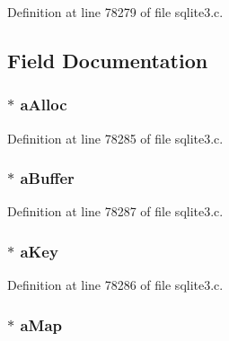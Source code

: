 Definition at line 78279 of file sqlite3.\+c.



\subsection{Field Documentation}
\hypertarget{struct_pma_reader_a1ddfef5f5a51dc36e8c4bf5166339531}{}
\subsubsection[{a\+Alloc}]{$\ast$ a\+Alloc}\label{struct_pma_reader_a1ddfef5f5a51dc36e8c4bf5166339531}


Definition at line 78285 of file sqlite3.\+c.

\hypertarget{struct_pma_reader_a0784b18f1d9bbdd738b38824a6166656}{}
\subsubsection[{a\+Buffer}]{$\ast$ a\+Buffer}\label{struct_pma_reader_a0784b18f1d9bbdd738b38824a6166656}


Definition at line 78287 of file sqlite3.\+c.

\hypertarget{struct_pma_reader_adf9b023fcbeb5fc12b86f133c62c64f4}{}
\subsubsection[{a\+Key}]{$\ast$ a\+Key}\label{struct_pma_reader_adf9b023fcbeb5fc12b86f133c62c64f4}


Definition at line 78286 of file sqlite3.\+c.

\hypertarget{struct_pma_reader_a91583d916d2032c7d35235563f55f64e}{}
\subsubsection[{a\+Map}]{$\ast$ a\+Map}\label{struct_pma_reader_a91583d916d2032c7d35235563f55f64e}


